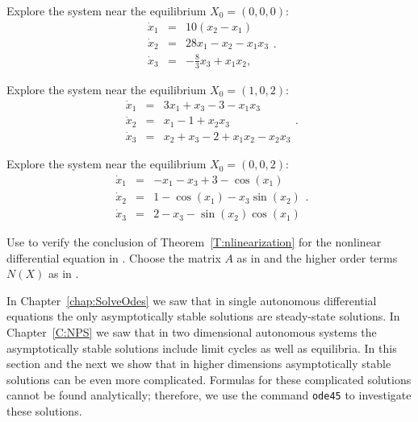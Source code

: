 \begin{exercise} \label{c11.4.1b}
Explore the system  near the equilibrium $X_0 = (0,0,0)$:
\begin{equation*}  \label{e11.4.1b}
\begin{array}{rcl}
\dot{x}_1 & = & 10(x_2-x_1)\\
\dot{x}_2 & = & 28 x_1 - x_2 - x_1x_3\\
\dot{x}_3 & = & -\frac{8}{3} x_3 + x_1x_2,
\end{array}.
\end{equation*}
\end{exercise}

\begin{exercise} \label{c11.4.1c}
Explore the system  near the equilibrium $X_0 = (1,0,2)$:
\begin{equation*}  \label{e11.4.1c}
\begin{array}{rcl}
\dot{x}_1 & = & 3x_1+x_3-3-x_1x_3\\
\dot{x}_2 & = & x_1 - 1 + x_2x_3\\
\dot{x}_3 & = & x_2 + x_3 -2 + x_1 x_2 - x_2 x_3
\end{array}.
\end{equation*}
\end{exercise}

\begin{exercise} \label{c11.4.1d}
Explore the system  near the equilibrium $X_0 = (0,0,2)$:
\begin{equation*}  \label{e11.4.1d}
\begin{array}{rcl}
\dot{x}_1 & = & -x_1-x_3+3-\cos(x_1)\\
\dot{x}_2 & = & 1-\cos(x_1) - x_3\sin(x_2)\\
\dot{x}_3 & = & 2-x_3 - \sin(x_2)\cos(x_1)
\end{array}.
\end{equation*}
\end{exercise}

\begin{exercise} \label{c11.4.7}
Use \Matlab to verify the conclusion of Theorem~\ref{T:nlinearization}
for the nonlinear differential equation in .  Choose
the matrix $A$ as in  and the higher order terms $N(X)$
as in .
\end{exercise}


\label{S:NLD}


In Chapter~\ref{chap:SolveOdes} we saw that in single autonomous differential 
equations the only asymptotically stable solutions are steady-state 
solutions.  In Chapter~\ref{C:NPS} we saw that in two dimensional autonomous
systems the asymptotically stable solutions include limit cycles
 as well as equilibria.  In this section and the next we 
show that in higher dimensions asymptotically stable solutions can be even 
more complicated.   Formulas for these complicated solutions cannot be found
analytically; therefore, we use the \Matlab command {\tt ode45}
 to investigate these solutions.  


